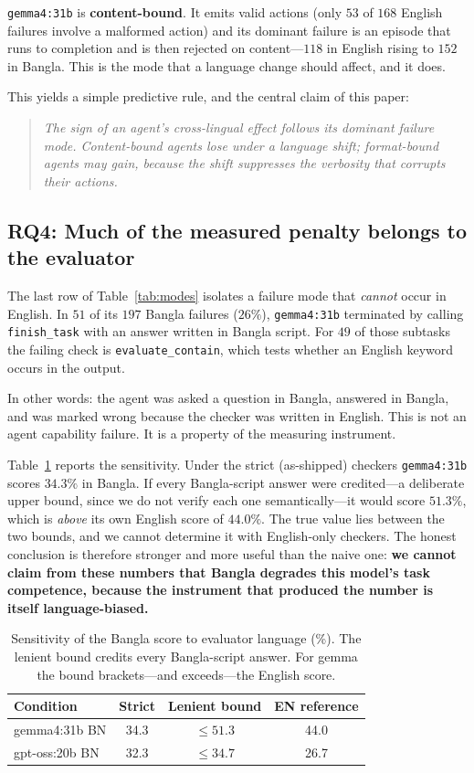 \documentclass[11pt]{article}
\begin{document}
\texttt{gemma4:31b} is \textbf{content-bound}. It emits valid actions (only $53$ of $168$
English failures involve a malformed action) and its dominant failure is an episode that runs to
completion and is then rejected on content---$118$ in English rising to $152$ in Bangla. This is
the mode that a language change should affect, and it does.

This yields a simple predictive rule, and the central claim of this paper:

\begin{quote}\itshape
The sign of an agent's cross-lingual effect follows its dominant failure mode. Content-bound
agents lose under a language shift; format-bound agents may gain, because the shift suppresses
the verbosity that corrupts their actions.
\end{quote}

\subsection{RQ4: Much of the measured penalty belongs to the evaluator}

The last row of Table~\ref{tab:modes} isolates a failure mode that \emph{cannot} occur in
English. In $51$ of its $197$ Bangla failures ($26\%$), \texttt{gemma4:31b} terminated by
calling \texttt{finish\_task} with an answer written in Bangla script. For $49$ of those
subtasks the failing check is \texttt{evaluate\_contain}, which tests whether an English keyword
occurs in the output.

In other words: the agent was asked a question in Bangla, answered in Bangla, and was marked
wrong because the checker was written in English. This is not an agent capability failure. It is
a property of the measuring instrument.

Table~\ref{tab:bounds} reports the sensitivity. Under the strict (as-shipped) checkers
\texttt{gemma4:31b} scores $34.3\%$ in Bangla. If every Bangla-script answer were credited---a
deliberate upper bound, since we do not verify each one semantically---it would score $51.3\%$,
which is \emph{above} its own English score of $44.0\%$. The true value lies between the two
bounds, and we cannot determine it with English-only checkers. The honest conclusion is
therefore stronger and more useful than the naive one: \textbf{we cannot claim from these
numbers that Bangla degrades this model's task competence, because the instrument that produced
the number is itself language-biased.}

\begin{table}[t]
\centering\small
\begin{tabular}{lccc}
\toprule
Condition & Strict & Lenient bound & EN reference \\
\midrule
gemma4:31b BN  & 34.3 & $\le 51.3$ & 44.0 \\
gpt-oss:20b BN & 32.3 & $\le 34.7$ & 26.7 \\
\bottomrule
\end{tabular}
\caption{Sensitivity of the Bangla score to evaluator language (\%). The lenient bound credits
every Bangla-script answer. For gemma the bound brackets---and exceeds---the English score.}
\label{tab:bounds}
\end{table}
\end{document}
